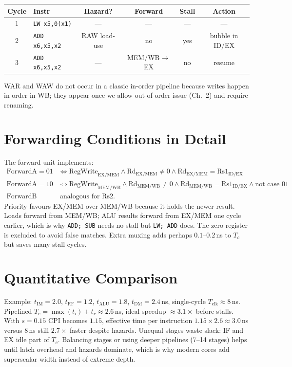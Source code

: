 \begin{center}
\begin{tabular}{clcccc}
\toprule Cycle & Instr & Hazard? & Forward & Stall & Action \\ \midrule
1 & \texttt{LW x5,0(x1)} & --- & --- & --- & --- \\
2 & \texttt{ADD x6,x5,x2} & RAW load-use & no & yes & bubble in ID/EX \\
3 & \texttt{ADD x6,x5,x2} & --- & MEM/WB$\to$EX & no & resume \\ \bottomrule
\end{tabular}
\end{center}

WAR and WAW do not occur in a classic in-order pipeline because writes happen in order in WB; they appear once we allow out-of-order issue (Ch.~2) and require renaming.

\section{Forwarding Conditions in Detail}
The forward unit implements:
\begin{align*}
\text{ForwardA}=01 &\iff \text{RegWrite}_{\text{EX/MEM}}\land \text{Rd}_{\text{EX/MEM}}\ne0\land \text{Rd}_{\text{EX/MEM}}=\text{Rs1}_{\text{ID/EX}}\\
\text{ForwardA}=10 &\iff \text{RegWrite}_{\text{MEM/WB}}\land \text{Rd}_{\text{MEM/WB}}\ne0\land \text{Rd}_{\text{MEM/WB}}=\text{Rs1}_{\text{ID/EX}}\land\text{not case }01\\
\text{ForwardB}&\ \text{analogous for Rs2}.
\end{align*}
Priority favours EX/MEM over MEM/WB because it holds the newer result. Loads forward from MEM/WB; ALU results forward from EX/MEM one cycle earlier, which is why \texttt{ADD; SUB} needs no stall but \texttt{LW; ADD} does. The zero register is excluded to avoid false matches. Extra muxing adds perhaps $0.1$--$0.2$\,ns to $T_c$ but saves many stall cycles.

\section{Quantitative Comparison}
Example: $t_{\text{IM}}=2.0$, $t_{\text{RF}}=1.2$, $t_{\text{ALU}}=1.8$, $t_{\text{DM}}=2.4$\,ns, single-cycle $T_{\text{clk}}\approx8$\,ns. Pipelined $T_c=\max(t_i)+t_r\approx2.6$\,ns, ideal speedup $\approx 3.1\times$ before stalls. With $s=0.15$ CPI becomes $1.15$, effective time per instruction $1.15\times2.6\approx3.0$\,ns versus $8$\,ns still $2.7\times$ faster despite hazards. Unequal stages waste slack: IF and EX idle part of $T_c$. Balancing stages or using deeper pipelines (7--14 stages) helps until latch overhead and hazards dominate, which is why modern cores add superscalar width instead of extreme depth.

